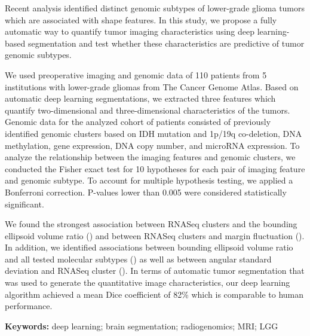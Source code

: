 

Recent analysis identified distinct genomic subtypes of lower-grade glioma tumors which are associated with shape features.
In this study, we propose a fully automatic way to quantify tumor imaging characteristics using deep learning-based segmentation and test whether these characteristics are predictive of tumor genomic subtypes.

We used preoperative imaging and genomic data of 110 patients from 5 institutions with lower-grade gliomas from The Cancer Genome Atlas.
Based on automatic deep learning segmentations, we extracted three features which quantify two-dimensional and three-dimensional characteristics of the tumors.
Genomic data for the analyzed cohort of patients consisted of previously identified genomic clusters based on IDH mutation and 1p/19q co-deletion, DNA methylation, gene expression, DNA copy number, and microRNA expression.
To analyze the relationship between the imaging features and genomic clusters, we conducted the Fisher exact test for 10 hypotheses for each pair of imaging feature and genomic subtype.
To account for multiple hypothesis testing, we applied a Bonferroni correction.
P-values lower than 0.005 were considered statistically significant.

We found the strongest association between RNASeq clusters and the bounding ellipsoid volume ratio () and between RNASeq clusters and margin fluctuation ().
In addition, we identified associations between bounding ellipsoid volume ratio and all tested molecular subtypes () as well as between angular standard deviation and RNASeq cluster ().
In terms of automatic tumor segmentation that was used to generate the quantitative image characteristics, our deep learning algorithm achieved a mean Dice coefficient of 82\% which is comparable to human performance.

\vspace{1em}
\noindent
\textbf{Keywords:} deep learning; brain segmentation; radiogenomics; MRI; LGG


